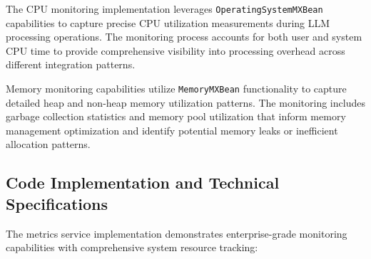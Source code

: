 
The CPU monitoring implementation leverages \texttt{OperatingSystemMXBean} capabilities to capture precise CPU utilization measurements during LLM processing operations. The monitoring process accounts for both user and system CPU time to provide comprehensive visibility into processing overhead across different integration patterns.

Memory monitoring capabilities utilize \texttt{MemoryMXBean} functionality to capture detailed heap and non-heap memory utilization patterns. The monitoring includes garbage collection statistics and memory pool utilization that inform memory management optimization and identify potential memory leaks or inefficient allocation patterns.

\subsection{Code Implementation and Technical Specifications}

The metrics service implementation demonstrates enterprise-grade monitoring capabilities with comprehensive system resource tracking:


